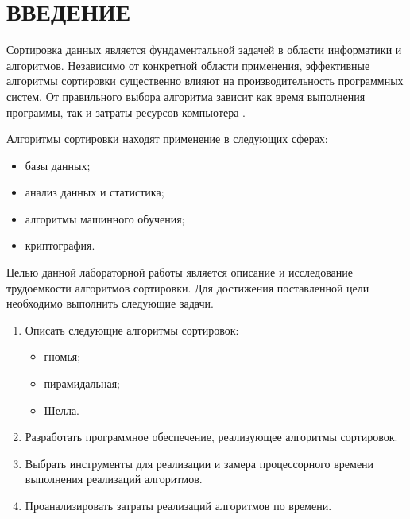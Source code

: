 \chapter*{ВВЕДЕНИЕ}

Сортировка данных является фундаментальной задачей в области информатики и алгоритмов. 
Независимо от конкретной области применения, эффективные алгоритмы сортировки существенно влияют на производительность программных систем. 
От правильного выбора алгоритма зависит как время выполнения программы, так и затраты ресурсов компьютера \cite{knut}.

Алгоритмы сортировки находят применение в следующих сферах:
\begin{itemize}
	\item базы данных;
	\item анализ данных и статистика;
	\item алгоритмы машинного обучения;
	\item криптография.
\end{itemize}

Целью данной лабораторной работы является описание и исследование трудоемкости алгоритмов сортировки.
Для достижения поставленной цели необходимо выполнить следующие задачи.

\begin{enumerate}
	\item Описать следующие алгоритмы сортировок: 
	\begin{itemize}
		\item гномья;
		\item пирамидальная;
		\item Шелла.
	\end{itemize}
	\item Разработать программное обеспечение, реализующее алгоритмы сортировок.
	\item Выбрать инструменты для реализации и замера процессорного времени
	выполнения реализаций алгоритмов.
	\item Проанализировать затраты реализаций алгоритмов по времени.
\end{enumerate}
